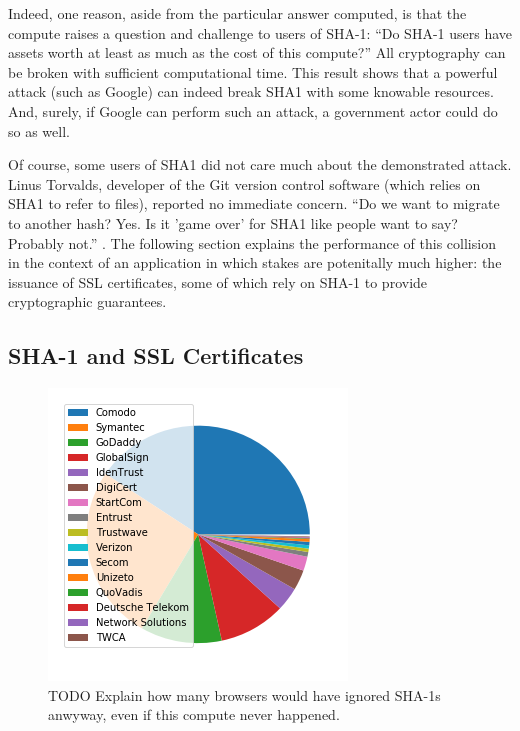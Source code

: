\documentclass[sigconf]{acmart}
\begin{document}
Indeed, one reason, aside from the particular answer computed, is that the compute raises a question and challenge to users of SHA-1:
``Do SHA-1 users have assets worth at least as much as the cost of this compute?''
All cryptography can be broken with sufficient computational time.
This result shows that a powerful attack (such as Google) can indeed break SHA1 with some knowable resources.
And, surely, if Google can perform such an attack, a government actor could do so as well.

Of course, some users of SHA1 did not care much about the demonstrated attack.
Linus Torvalds, developer of the Git version control software (which relies on SHA1 to refer to files), reported no immediate concern.
``Do we want to migrate to another hash? Yes. Is it 'game over' for SHA1 like people want to say? Probably not.'' \cite{Torvalds2017}.
The following section explains the performance of this collision in the context of 
an application in which stakes are potenitally much higher:
the issuance of SSL certificates, some of which rely on SHA-1 to provide cryptographic guarantees.

\subsection{SHA-1 and SSL Certificates}
\label{sec:org1dc8533}

\begin{figure}[t!]
\centering
\includegraphics[width=.9\linewidth]{./figures/ca-share.png}
\caption{TODO Explain how many browsers would have ignored SHA-1s anwyway, even if this compute never happened.}
\end{figure}
\end{document}
